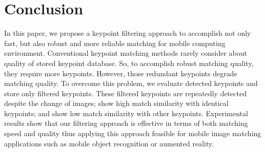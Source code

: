 
\section{Conclusion}





In this paper, we propose a keypoint filtering approach to accomplish not only fast, but also robust and more reliable matching for mobile computing environment. Conventional keypoint matching methods rarely consider about quality of stored keypoint database. So, to accomplish robust matching quality, they require more keypoints. However, those redundant keypoints degrade matching quality. To overcome this problem, we evaluate detected keypoints and store only filtered keypoints. These filtered keypoints are repeatedly detected despite the change of images; show high match similarity with identical keypoints; and show low match similarity with other keypoints. Experimental results show that our filtering approach is effective in terms of both matching speed and quality thus applying this approach feasible for mobile image matching applications such as mobile object recognition or aumented reality.









